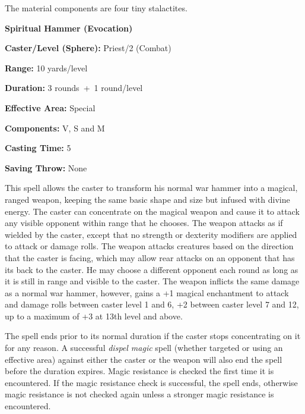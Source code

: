 \begin{multicols}{2}
The material components are four tiny stalactites.

\vspace{1em}

\noindent
\begin{minipage}{\columnwidth}

\noindent \textbf{Spiritual Hammer (Evocation)}

\noindent \textbf{Caster/Level (Sphere):} Priest/2 (Combat)

\noindent \textbf{Range:} 10 yards/level

\noindent \textbf{Duration:} 3 rounds~+~1 round/level

\noindent \textbf{Effective Area:} Special

\noindent \textbf{Components:} V, S and M

\noindent \textbf{Casting Time:} 5

\noindent \textbf{Saving Throw:} None

\end{minipage}

This spell allows the caster to transform his normal war hammer into a magical, ranged weapon, keeping the same basic shape and size but infused with divine energy.  The caster can concentrate on the magical weapon and cause it to attack any visible opponent within range that he chooses.  The weapon attacks as if wielded by the caster, except that no strength or dexterity modifiers are applied to attack or damage rolls.  The weapon attacks creatures based on the direction that the caster is facing, which may allow rear attacks on an opponent that has its back to the caster.  He may choose a different opponent each round as long as it is still in range and visible to the caster.  The weapon inflicts the same damage as a normal war hammer, however, gains a +1 magical enchantment to attack and damage rolls between caster level 1 and 6, +2 between caster level 7 and 12, up to a maximum of +3 at 13th level and above.

The spell ends prior to its normal duration if the caster stops concentrating on it for any reason.  A successful \textit{dispel magic} spell (whether targeted or using an effective area) against either the caster or the weapon will also end the spell before the duration expires.  Magic resistance is checked the first time it is encountered.  If the magic resistance check is successful, the spell ends, otherwise magic resistance is not checked again unless a stronger magic resistance is encountered.


\end{multicols}

